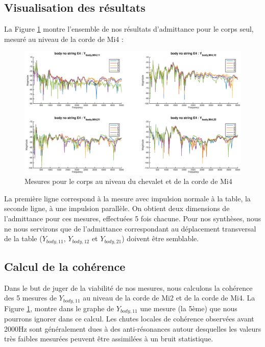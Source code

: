 \subsection{Visualisation des résultats}
La Figure \ref{fig:goll} montre l'ensemble de nos résultats d'admittance pour le corps seul, mesuré au niveau de la corde de Mi4 : 
\begin{figure}[h]
\centering
\includegraphics[width = 14cm]{figures/Y_body_E4.eps}
\caption{Mesures pour le corps au niveau du chevalet et de la corde de Mi4}
\label{fig:goll}
\end{figure}
La première ligne correspond à la mesure avec impulsion normale à la table, la seconde ligne, à une impulsion parallèle. On obtient deux dimensions de l'admittance pour ces mesures, effectuées 5 fois chacune. Pour nos synthèses, nous ne nous servirons que de l'admittance correspondant au déplacement transversal de la table ($Y_{body,11}$, $Y_{body,12}$ et $Y_{body,21}$) doivent être semblable.\\
\subsection{Calcul de la cohérence}
Dans le but de juger de la viabilité de nos mesures, nous calculons la cohérence des 5 mesures de $Y_{body,11}$ au niveau de la corde de Mi2 et de la corde de Mi4. La Figure \ref{fig:goll},  montre dans le graphe de $Y_{body,11}$ une mesure (la 5ème) que nous pourrons ignorer dans ce calcul. Les chutes locales de cohérence observées avant 2000Hz sont généralement dues à des anti-résonances autour desquelles les valeurs très faibles mesurées peuvent être assimilées à un bruit statistique.


